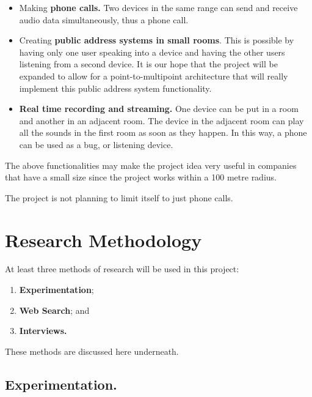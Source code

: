 \documentclass[12pt,svgnames,smaller]{article} %
\begin{document}
	\begin{itemize}
		\item Making \textbf{phone calls.} Two devices in the same range can send and receive audio data simultaneously, thus a phone call. 
		\item Creating \textbf{public address systems in small rooms}. This is possible by having only one user speaking into a device and having the other users listening from a second device. It is our hope that the project will be expanded to allow for a point-to-multipoint architecture that will really implement this public address system functionality.
		\item \textbf{Real time recording and streaming.} One device can be put in a room and another in an adjacent room. The device in the adjacent room can play all the sounds in the first room as soon as they happen. In this way, a phone can be used as a bug, or listening device.
	\end{itemize}
	
	The above functionalities may make the project idea very useful in companies that have a small size since the project works within a 100 metre radius.
	
	The project is not planning to limit itself to just phone calls.
	

	\newpage
	\section{\textbf{ Research Methodology} } 
	
	At least three methods of research will be used in this project:
	
	\begin{enumerate}
		\item \textbf{Experimentation};
		\item \textbf{Web Search}; and
		\item \textbf{Interviews.}
	\end{enumerate}
	
	These methods are discussed here underneath.
	
		\subsection{Experimentation.}
		
\end{document}

